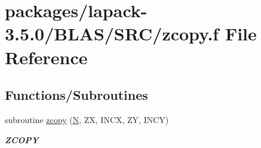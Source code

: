 \hypertarget{lapack-3_85_80_2BLAS_2SRC_2zcopy_8f}{}\section{packages/lapack-\/3.5.0/\+B\+L\+A\+S/\+S\+R\+C/zcopy.f File Reference}
\label{lapack-3_85_80_2BLAS_2SRC_2zcopy_8f}
\subsection*{Functions/\+Subroutines}
\begin{DoxyCompactItemize}
\item 
subroutine \hyperlink{group__complex16__blas__level1_gad9555fe739d307171aa5abedd291631a}{zcopy} (\hyperlink{polmisc_8c_a0240ac851181b84ac374872dc5434ee4}{N}, Z\+X, I\+N\+C\+X, Z\+Y, I\+N\+C\+Y)
\begin{DoxyCompactList}\small\item\em {\bfseries Z\+C\+O\+P\+Y} \end{DoxyCompactList}\end{DoxyCompactItemize}
